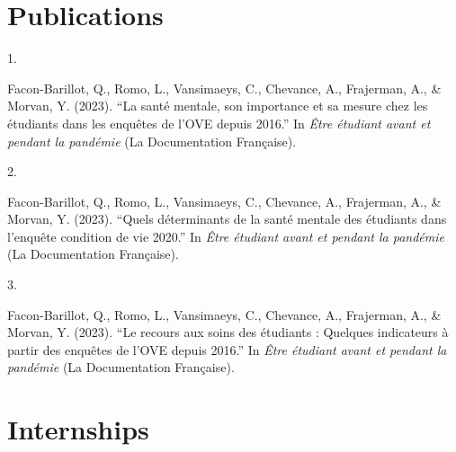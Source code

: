 \documentclass[11pt,a4paper,]{awesome-cv}
\newlength{\cslhangindent}
\newlength{\csllabelwidth}
\newenvironment{CSLReferences}[2] %
 {\begin{list}{}{%
  \setlength{\itemindent}{0pt}
  \setlength{\leftmargin}{0pt}
  \setlength{\parsep}{0pt}
  \ifodd #1
   \setlength{\leftmargin}{\cslhangindent}
   \setlength{\itemindent}{-1\cslhangindent}
  \fi
  \setlength{\itemsep}{#2\baselineskip}}}
 {\end{list}}
\newcommand{\CSLLeftMargin}[1]{\parbox[t]{\csllabelwidth}{\strut#1\strut}}
\newcommand{\CSLRightInline}[1]{\parbox[t]{\linewidth - \csllabelwidth}{\strut#1\strut}}
\begin{document}
\hypertarget{publications}{%
\section{Publications}\label{publications}}

\hypertarget{refs-d2ea89843c453d65022ea2f9d482217a}{}
\begin{CSLReferences}{0}{0}
\leavevmode{}%
\CSLLeftMargin{1. }%
\CSLRightInline{Facon-Barillot, Q., Romo, L., Vansimaeys, C., Chevance,
A., Frajerman, A., \& Morvan, Y. (2023). {``La santé mentale, son
importance et sa mesure chez les étudiants dans les enquêtes de l'OVE
depuis 2016.''} In \emph{Être étudiant avant et pendant la pandémie} (La
Documentation Française).}

\leavevmode{}%
\CSLLeftMargin{2. }%
\CSLRightInline{Facon-Barillot, Q., Romo, L., Vansimaeys, C., Chevance,
A., Frajerman, A., \& Morvan, Y. (2023). {``Quels déterminants de la
santé mentale des étudiants dans l'enquête condition de vie 2020.''} In
\emph{Être étudiant avant et pendant la pandémie} (La Documentation
Française).}

\leavevmode{}%
\CSLLeftMargin{3. }%
\CSLRightInline{Facon-Barillot, Q., Romo, L., Vansimaeys, C., Chevance,
A., Frajerman, A., \& Morvan, Y. (2023). {``Le recours aux soins des
étudiants : Quelques indicateurs à partir des enquêtes de l'OVE depuis
2016.''} In \emph{Être étudiant avant et pendant la pandémie} (La
Documentation Française).}

\end{CSLReferences}

\hypertarget{internships}{%
\section{Internships}\label{internships}}

\begin{cventries}
\end{cventries}
\end{document}

